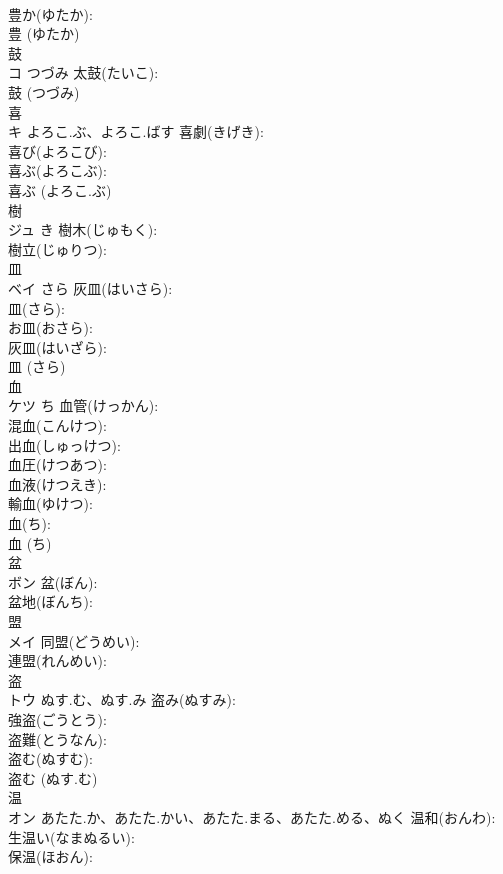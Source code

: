 \documentclass[8pt]{extreport}
\begin{document}
\begin{CJK}{UTF8}{min}
\\	豊か(ゆたか): 
\\	豊 (ゆたか)
\\	鼓			
\\	コ	つづみ	太鼓(たいこ): 
\\	鼓 (つづみ)
\\	喜			
\\	キ	よろこ.ぶ、よろこ.ばす	喜劇(きげき): 
\\	喜び(よろこび): 
\\	喜ぶ(よろこぶ): 
\\	喜ぶ (よろこ.ぶ)
\\	樹			
\\	ジュ	き	樹木(じゅもく): 
\\	樹立(じゅりつ): 
\\	皿			
\\	ベイ	さら	灰皿(はいさら): 
\\	皿(さら): 
\\	お皿(おさら): 
\\	灰皿(はいざら): 
\\	皿 (さら)
\\	血			
\\	ケツ	ち	血管(けっかん): 
\\	混血(こんけつ): 
\\	出血(しゅっけつ): 
\\	血圧(けつあつ): 
\\	血液(けつえき): 
\\	輸血(ゆけつ): 
\\	血(ち): 
\\	血 (ち)
\\	盆			
\\	ボン		盆(ぼん): 
\\	盆地(ぼんち): 
\\	盟			
\\	メイ		同盟(どうめい): 
\\	連盟(れんめい): 
\\	盗			
\\	トウ	ぬす.む、ぬす.み	盗み(ぬすみ): 
\\	強盗(ごうとう): 
\\	盗難(とうなん): 
\\	盗む(ぬすむ): 
\\	盗む (ぬす.む)
\\	温			
\\	オン	あたた.か、あたた.かい、あたた.まる、あたた.める、ぬく	温和(おんわ): 
\\	生温い(なまぬるい): 
\\	保温(ほおん): 

\end{CJK}
\end{document}
